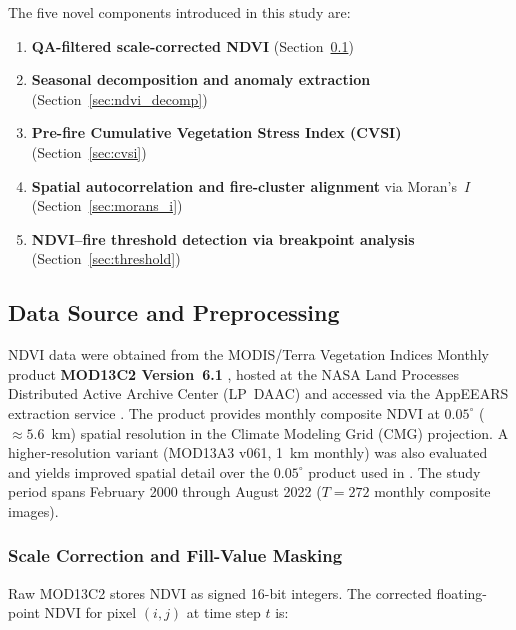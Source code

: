 \documentclass[12pt, a4paper]{article}
\begin{document}
The five novel components introduced in this study are:

\begin{enumerate}
    \item \textbf{QA-filtered scale-corrected NDVI} (Section~\ref{sec:ndvi_data})
    \item \textbf{Seasonal decomposition and anomaly extraction}
          (Section~\ref{sec:ndvi_decomp})
    \item \textbf{Pre-fire Cumulative Vegetation Stress Index (CVSI)}
          (Section~\ref{sec:cvsi})
    \item \textbf{Spatial autocorrelation and fire-cluster alignment}
          via Moran's~$I$ (Section~\ref{sec:morans_i})
    \item \textbf{NDVI--fire threshold detection via breakpoint analysis}
          (Section~\ref{sec:threshold})
\end{enumerate}

\subsection{Data Source and Preprocessing}
\label{sec:ndvi_data}

NDVI data were obtained from the MODIS/Terra Vegetation Indices Monthly
product \textbf{MOD13C2 Version~6.1} \citep{didan2021}, hosted at the
NASA Land Processes Distributed Active Archive Center (LP~DAAC) and
accessed via the AppEEARS extraction service \citep{appeears2023}.
The product provides monthly composite NDVI at $0.05^{\circ}$
(${\approx}5.6$~km) spatial resolution in the Climate Modeling Grid
(CMG) projection. A higher-resolution variant (MOD13A3 v061, 1~km
monthly) was also evaluated and yields improved spatial detail over the
$0.05^{\circ}$ product used in \citet{biswas2025}. The study period
spans February 2000 through August 2022 ($T = 272$ monthly composite
images).

\subsubsection{Scale Correction and Fill-Value Masking}
\label{sec:scale}

Raw MOD13C2 stores NDVI as signed 16-bit integers. The corrected
floating-point NDVI for pixel $(i,j)$ at time step $t$ is:
\end{document}
